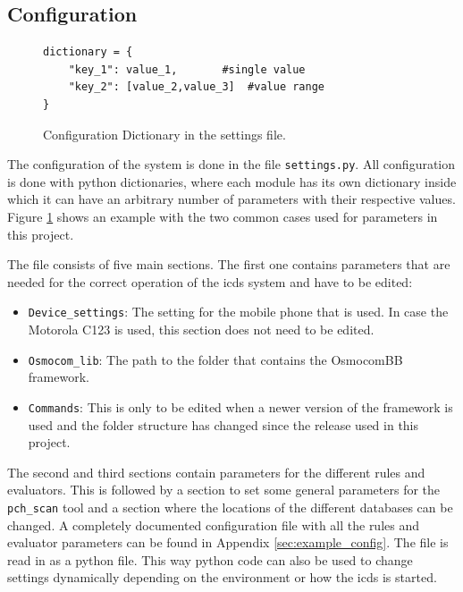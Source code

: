 \subsection{Configuration}
\label{sec:configuration}
\begin{figure}
\hspace*{\dimexpr\fboxsep+\fboxrule}%
\begin{minipage}{\dimexpr\textwidth-4\fboxsep-2\fboxrule} 
\begin{lstlisting}
dictionary = {
	"key_1": value_1,		#single value
	"key_2": [value_2,value_3]	#value range
}
\end{lstlisting}
\end{minipage}
\caption{Configuration Dictionary in the settings file.}
\label{fig:python_dict}
\end{figure}
The configuration of the system is done in the file \texttt{settings.py}.
All configuration is done with python dictionaries, where each module has its own dictionary inside which it can have an arbitrary number of parameters with their respective values.
Figure \ref{fig:python_dict} shows an example with the two common cases used for parameters in this project.

The file consists of five main sections.
The first one contains parameters that are needed for the correct operation of the \gls{icds} system and have to be edited:
\begin{itemize}
	\item \texttt{Device\_settings}: The setting for the mobile phone that is used.
	In case the Motorola C123 is used, this section does not need to be edited.
	\item \texttt{Osmocom\_lib}: The path to the folder that contains the OsmocomBB framework.
	\item \texttt{Commands}: This is only to be edited when a newer version of the framework is used and the folder structure has changed since the release used in this project.
\end{itemize}
The second and third sections contain parameters for the different rules and evaluators.
This is followed by a section to set some general parameters for the \texttt{pch\_scan} tool and a section where the locations of the different databases can be changed.
A completely documented configuration file with all the rules and evaluator parameters can be found in Appendix \ref{sec:example_config}.
The file is read in as a python file.
This way python code can also be used to change settings dynamically depending on the environment or how the \gls{icds} is started.

